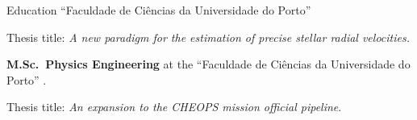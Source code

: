 
\begin{rubric}{Education}
%
	 ``Faculdade de Ciências da Universidade do Porto''

	\par Thesis title: \emph{A new paradigm for the estimation of precise stellar radial velocities.}
%

\entry*[\dates{2014/2019}]%
	\textbf{M.Sc.~Physics Engineering} at the ``Faculdade de Ciências da Universidade do Porto'' .\par
	Thesis title: \emph{An expansion to the CHEOPS mission official pipeline}. 

\end{rubric}



